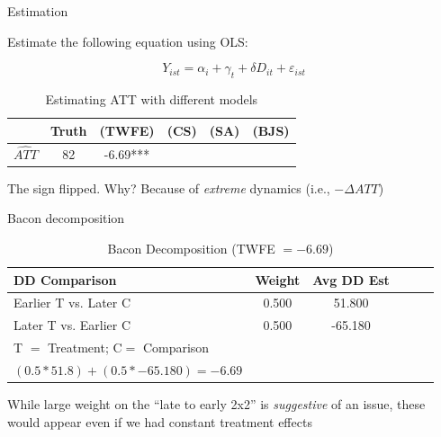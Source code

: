 \documentclass{beamer}
\begin{document}
    

\begin{frame}{Estimation}

\bigskip

Estimate the following equation using OLS:

$$Y_{ist} = \alpha_i + \gamma_t +\delta D_{it} + \varepsilon_{ist}$$


\begin{table}[htbp]\centering
\small
\caption{Estimating ATT with different models}
\begin{center}
\begin{tabular}{l*{5}{c}}
\hline
\multicolumn{1}{l}{\textbf{}}&
\multicolumn{1}{c}{\textbf{Truth}}&
\multicolumn{1}{c}{\textbf{(TWFE)}}&
\multicolumn{1}{c}{\textbf{(CS)}}&
\multicolumn{1}{c}{\textbf{(SA)}}&
\multicolumn{1}{c}{\textbf{(BJS)}}\\
\hline
$\widehat{ATT}$  & 82    & -6.69*** &&&\\
\hline
\end{tabular}
\end{center}
\end{table}

The sign flipped.  Why?  Because of \emph{extreme} dynamics (i.e., $- \Delta ATT$)

\end{frame}

\begin{frame}{Bacon decomposition}
\begin{table}[htbp]\centering
\small
\caption{Bacon Decomposition (TWFE $= -6.69$)}
\begin{center}
\begin{tabular}{l*{5}{c}}
\hline
\multicolumn{1}{l}{\textbf{DD Comparison}}&
\multicolumn{1}{l}{\textbf{Weight}}&
\multicolumn{1}{l}{\textbf{Avg DD Est}}\\
\hline
Earlier T vs. Later C  &     0.500   &       51.800 \\
Later T vs. Earlier C   &    0.500    &     -65.180 \\
\midrule
T $=$ Treatment; C$ =$ Comparison \\
$(0.5*51.8) + (0.5*-65.180) = -6.69$ \\
\hline
\end{tabular}
\end{center}
\end{table}

\bigskip

While large weight on the ``late to early 2x2'' is \emph{suggestive} of an issue, these would appear even if we had constant treatment effects

\end{frame}
\end{document}

